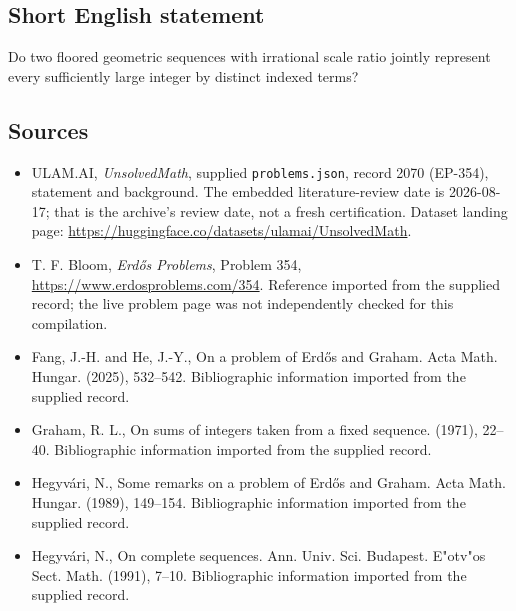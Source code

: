 \documentclass[11pt,a4paper]{article}
\begin{document}
\subsection{Short English statement}

Do two floored geometric sequences with irrational scale ratio jointly represent every sufficiently large integer by distinct indexed terms?

\subsection{Sources}

{\small

\begin{itemize}

\item[\hypertarget{source:2070:1}{S1}] ULAM.AI, \emph{UnsolvedMath}, supplied \texttt{problems.json}, record 2070 (EP-354), statement and background. The embedded literature-review date is 2026-08-17; that is the archive’s review date, not a fresh certification. Dataset landing page: \url{https://huggingface.co/datasets/ulamai/UnsolvedMath}.

\item[\hypertarget{source:2070:2}{S2}] T. F. Bloom, \emph{Erdős Problems}, Problem 354, \url{https://www.erdosproblems.com/354}. Reference imported from the supplied record; the live problem page was not independently checked for this compilation.

\item[\hypertarget{source:2070:3}{S3}] Fang, J.-H. and He, J.-Y., On a problem of {E}rd\H{o}s and {G}raham. Acta Math. Hungar. (2025), 532--542. Bibliographic information imported from the supplied record.

\item[\hypertarget{source:2070:4}{S4}] Graham, R. L., On sums of integers taken from a fixed sequence. (1971), 22--40. Bibliographic information imported from the supplied record.

\item[\hypertarget{source:2070:5}{S5}] Hegyv\'ari, N., Some remarks on a problem of {E}rd\H{o}s and {G}raham. Acta Math. Hungar. (1989), 149--154. Bibliographic information imported from the supplied record.

\item[\hypertarget{source:2070:6}{S6}] Hegyv\'ari, N., On complete sequences. Ann. Univ. Sci. Budapest. E"otv"os Sect. Math. (1991), 7--10. Bibliographic information imported from the supplied record.

\end{itemize}

}

\label{end:2070}
\end{document}
